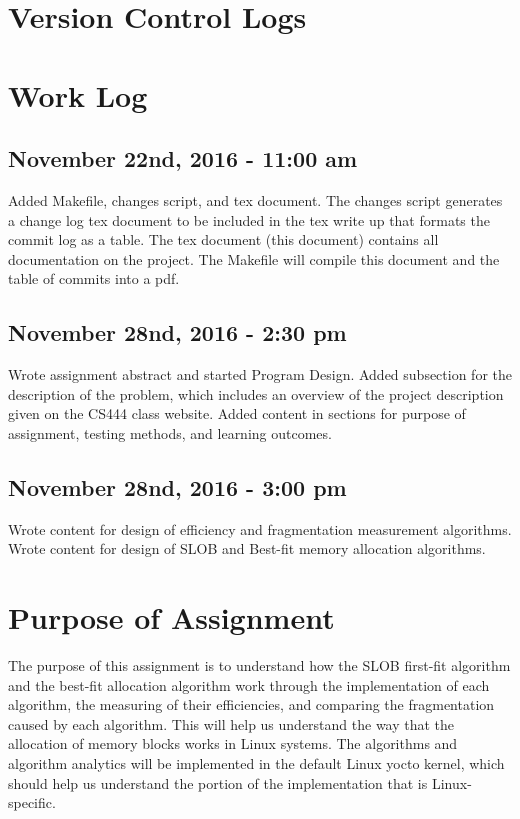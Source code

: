 \documentclass[letterpaper,10pt]{article}
\begin{document}
\section{Version Control Logs}


\section{Work Log}
\subsection{November 22nd, 2016 - 11:00 am}
Added Makefile, changes script, and tex document. 
The changes script generates a change log tex document to be included in the tex write up that formats 
the commit log as a table. 
The tex document (this document) contains all documentation on the project. 
The Makefile will compile this document and the table of commits into a pdf.

\subsection{November 28nd, 2016 - 2:30 pm}
Wrote assignment abstract and started Program Design.
Added subsection for the description of the problem, which includes an overview of the project 
description given on the CS444 class website.
Added content in sections for purpose of assignment, testing methods, and learning outcomes.

\subsection{November 28nd, 2016 - 3:00 pm}
Wrote content for design of efficiency and fragmentation measurement algorithms.
Wrote content for design of SLOB and Best-fit memory allocation algorithms.

\section{Purpose of Assignment}
The purpose of this assignment is to understand how the SLOB first-fit algorithm and the best-fit 
allocation algorithm work through the implementation of each algorithm, the measuring of their 
efficiencies, and comparing the fragmentation caused by each algorithm. This will help us understand
 the way that the allocation of memory blocks works in Linux systems. The algorithms and algorithm 
analytics will be implemented in the default Linux yocto kernel, which should help us understand the
 portion of the implementation that is Linux-specific.
\end{document}
